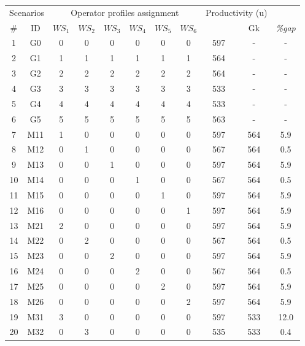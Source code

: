 \documentclass[review,12pt, 3p, times]{elsarticle}
\begin{document}
\setcounter{table}{0}
\begin{table}[htbp] 
	\begin{center}
					
					   
		\begin{longtable}{cc|cccccc|ccc|}
			\hline
			\multicolumn{2}{c|}{Scenarios} & \multicolumn{6}{c|}{Operator profiles assignment}& \multicolumn{2}{c}{Productivity (u)}&\\
			\# & ID  & $\textit{WS}_1$ & $\textit{WS}_2$ & $\textit{WS}_3$ & $\textit{WS}_4$ & $\textit{WS}_5$ & $\textit{WS}_6$ & 
			& Gk   & \it{\%gap} \\ 
			\hline
			1  & G0  & 0 & 0 & 0 & 0 & 0 & 0 & 597 & -   & -    \\
			2  & G1  & 1 & 1 & 1 & 1 & 1 & 1 & 564 & -   & -    \\
			3  & G2  & 2 & 2 & 2 & 2 & 2 & 2 & 564 & -   & -    \\
			4  & G3  & 3 & 3 & 3 & 3 & 3 & 3 & 533 & -   & -    \\
			5  & G4  & 4 & 4 & 4 & 4 & 4 & 4 & 533 & -   & -    \\
			6  & G5  & 5 & 5 & 5 & 5 & 5 & 5 & 563 & -   & -    \\
			\hline
			7  & M11 & 1 & 0 & 0 & 0 & 0 & 0 & 597 & 564 & 5.9  \\
			8  & M12 & 0 & 1 & 0 & 0 & 0 & 0 & 567 & 564 & 0.5  \\
			9  & M13 & 0 & 0 & 1 & 0 & 0 & 0 & 597 & 564 & 5.9  \\
			10 & M14 & 0 & 0 & 0 & 1 & 0 & 0 & 567 & 564 & 0.5  \\
			11 & M15 & 0 & 0 & 0 & 0 & 1 & 0 & 597 & 564 & 5.9  \\
			12 & M16 & 0 & 0 & 0 & 0 & 0 & 1 & 597 & 564 & 5.9  \\
			\hline
			13 & M21 & 2 & 0 & 0 & 0 & 0 & 0 & 597 & 564 & 5.9  \\
			14 & M22 & 0 & 2 & 0 & 0 & 0 & 0 & 567 & 564 & 0.5  \\
			15 & M23 & 0 & 0 & 2 & 0 & 0 & 0 & 597 & 564 & 5.9  \\
			16 & M24 & 0 & 0 & 0 & 2 & 0 & 0 & 567 & 564 & 0.5  \\
			17 & M25 & 0 & 0 & 0 & 0 & 2 & 0 & 597 & 564 & 5.9  \\
			18 & M26 & 0 & 0 & 0 & 0 & 0 & 2 & 597 & 564 & 5.9  \\
			\hline
			19 & M31 & 3 & 0 & 0 & 0 & 0 & 0 & 597 & 533 & 12.0 \\
			20 & M32 & 0 & 3 & 0 & 0 & 0 & 0 & 535 & 533 & 0.4  \\

\end{longtable}
\end{center}
\end{table}
\end{document}
